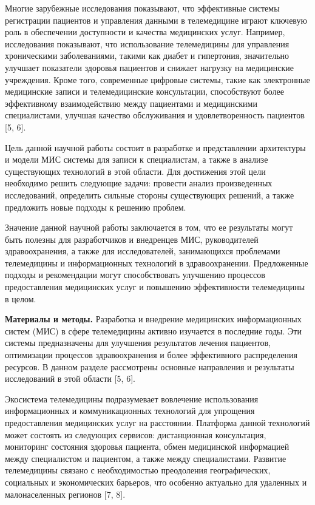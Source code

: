 Многие зарубежные исследования показывают, что эффективные системы
регистрации пациентов и управления данными в телемедицине играют
ключевую роль в обеспечении доступности и качества медицинских услуг.
Например, исследования показывают, что использование телемедицины для
управления хроническими заболеваниями, такими как диабет и гипертония,
значительно улучшает показатели здоровья пациентов и снижает нагрузку на
медицинские учреждения. Кроме того, современные цифровые системы, такие
как электронные медицинские записи и телемедицинские консультации,
способствуют более эффективному взаимодействию между пациентами и
медицинскими специалистами, улучшая качество обслуживания и
удовлетворенность пациентов {[}5, 6{]}.

Цель данной научной работы состоит в разработке и представлении
архитектуры и модели МИС системы для записи к специалистам, а также в
анализе существующих технологий в этой области. Для достижения этой цели
необходимо решить следующие задачи: провести анализ произведенных
исследований, определить сильные стороны существующих решений, а также
предложить новые подходы к решению проблем.

Значение данной научной работы заключается в том, что ее результаты
могут быть полезны для разработчиков и внедренцев МИС, руководителей
здравоохранения, а также для исследователей, занимающихся проблемами
телемедицины и информационных технологий в здравоохранении. Предложенные
подходы и рекомендации могут способствовать улучшению процессов
предоставления медицинских услуг и повышению эффективности телемедицины
в целом.

{\bfseries Материалы и методы.} Разработка и внедрение медицинских
информационных систем (МИС) в сфере телемедицины активно изучается в
последние годы. Эти системы предназначены для улучшения результатов
лечения пациентов, оптимизации процессов здравоохранения и более
эффективного распределения ресурсов. В данном разделе рассмотрены
основные направления и результаты исследований в этой области {[}5,
6{]}.

Экосистема телемедицины подразумевает вовлечение использования
информационных и коммуникационных технологий для упрощения
предоставления медицинских услуг на расстоянии. Платформа данной
технологий может состоять из следующих сервисов: дистанционная
консультация, мониторинг состояния здоровья пациента, обмен медицинской
информацией между специалистом и пациентом, а также между специалистами.
Развитие телемедицины связано с необходимостью преодоления
географических, социальных и экономических барьеров, что особенно
актуально для удаленных и малонаселенных регионов {[}7, 8{]}.

